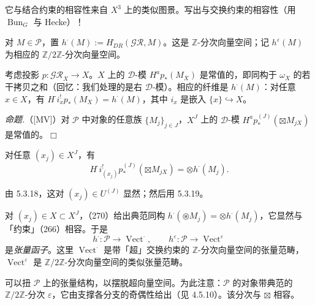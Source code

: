 它与结合约束的相容性来自 $X^{3}$ 上的类似图景。写出与交换约束的相容性（用 $\operatorname{Bun}_G$ 与 Hecke）！


 对 $M\in\mathcal{P}$，置 $h^{\cdot}(M):=H^{\cdot}_{DR}(\mathcal{GR},M)$。这是 $\mathbb{Z}$-分次向量空间；记 $h^{\varepsilon}(M)$ 为相应的 $\mathbb{Z}/2\mathbb{Z}$-分次向量空间。

考虑投影 $p:\mathcal{GR}_X\to X$。$X$ 上的 $\mathcal{D}$-模 $H^ap_*(M_X)$ 是常值的，即同构于 $\omega_X$ 的若干拷贝之和（回忆：我们处理的是右 $\mathcal{D}$-模）。相应的纤维是 $h^{\cdot}(M)$：对任意 $x\in X$，有 $H^{\cdot}i_x^{!}p_*(M_X)=h^{\cdot}(M)$，其中 $i_x$ 是嵌入 $\{x\}\hookrightarrow X$。

 \emph{命题.}（[MV]）对 $\mathcal{P}$ 中对象的任意族 $\{M_j\}_{j\in J}$，$X^J$ 上的 $\mathcal{D}$-模 $H^ap_*^{(J)}(\boxtimes M_{jX})$ 是常值的。\hfill$\Box$

对任意 $(x_j)\in X^J$，有
\begin{equation}\tag{270}
H^{\cdot}i^{!}_{(x_j)}p_*^{(J)}(\boxtimes M_{jX})=\otimes h^{\cdot}(M_j).
\end{equation}

由 5.3.18，这对 $(x_j)\in U^{(J)}$ 显然；然后用 5.3.19。

 对 $(x_j)\in X\subset X^J$，（270）给出典范同构 $h^{\cdot}(\circledast M_j)=\otimes h^{\cdot}(M_j)$，它显然与「约束」（266）相容。于是
\begin{equation}\tag{271}
h^{\cdot}:\mathcal{P}\to\operatorname{Vect}^{\cdot},\qquad h^{\varepsilon}:\mathcal{P}\to\operatorname{Vect}^{\varepsilon}
\end{equation}
是\emph{张量函子}。这里 $\operatorname{Vect}^{\cdot}$ 是带「超」交换约束的 $\mathbb{Z}$-分次向量空间的张量范畴，$\operatorname{Vect}^{\varepsilon}$ 是 $\mathbb{Z}/2\mathbb{Z}$-分次向量空间的类似张量范畴。

 可以扭 $\mathcal{P}$ 上的张量结构，以摆脱超向量空间。为此注意：$\mathcal{P}$ 的对象带典范的 $\mathbb{Z}/2\mathbb{Z}$-分次 $\varepsilon$，它由支撑各分支的奇偶性给出（见 4.5.10）。该分次与 $\boxtimes$ 相容。

